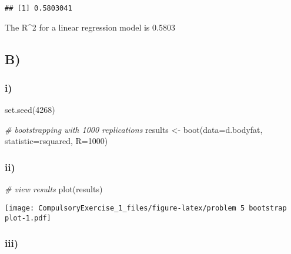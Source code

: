 \documentclass[
]{article}
\newenvironment{Shaded}{\begin{snugshade}}{\end{snugshade}}
\newcommand{\AttributeTok}[1]{\textcolor[rgb]{0.77,0.63,0.00}{#1}}
\newcommand{\CommentTok}[1]{\textcolor[rgb]{0.56,0.35,0.01}{\textit{#1}}}
\newcommand{\DecValTok}[1]{\textcolor[rgb]{0.00,0.00,0.81}{#1}}
\newcommand{\FunctionTok}[1]{\textcolor[rgb]{0.00,0.00,0.00}{#1}}
\newcommand{\NormalTok}[1]{#1}
\newcommand{\OtherTok}[1]{\textcolor[rgb]{0.56,0.35,0.01}{#1}}
\newcommand{\SpecialCharTok}[1]{\textcolor[rgb]{0.00,0.00,0.00}{#1}}
\begin{document}
\begin{verbatim}
## [1] 0.5803041
\end{verbatim}

The R\^{}2 for a linear regression model is 0.5803

\hypertarget{b-3}{%
\subsection{B)}\label{b-3}}

\hypertarget{i-3}{%
\subsubsection{i)}\label{i-3}}

\begin{Shaded}
\begin{Highlighting}[]
\FunctionTok{set.seed}\NormalTok{(}\DecValTok{4268}\NormalTok{)}

\CommentTok{\# bootstrapping with 1000 replications}
\NormalTok{results }\OtherTok{\textless{}{-}} \FunctionTok{boot}\NormalTok{(}\AttributeTok{data=}\NormalTok{d.bodyfat, }\AttributeTok{statistic=}\NormalTok{rsquared,}
                \AttributeTok{R=}\DecValTok{1000}\NormalTok{)}
\end{Highlighting}
\end{Shaded}

\hypertarget{ii-3}{%
\subsubsection{ii)}\label{ii-3}}

\begin{Shaded}
\begin{Highlighting}[]
\CommentTok{\# view results}
\FunctionTok{plot}\NormalTok{(results)}
\end{Highlighting}
\end{Shaded}

\texttt{[image: CompulsoryExercise\_1\_files/figure-latex/problem 5 bootstrap plot-1.pdf]}

\hypertarget{iii-1}{%
\subsubsection{iii)}\label{iii-1}}

\begin{Shaded}
\end{Shaded}
\end{document}
